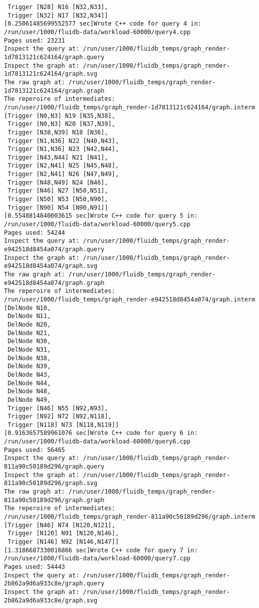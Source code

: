 \begin{code}
\begin{verbatim}
 Trigger [N28] N16 [N32,N33],
 Trigger [N32] N17 [N32,N34]]
[0.25061485699552577 sec]Wrote C++ code for query 4 in: /run/user/1000/fluidb-data/workload-60000/query4.cpp
Pages used: 23231
Inspect the query at: /run/user/1000/fluidb_temps/graph_render-1d7813121c624164/graph.query
Inspect the graph at: /run/user/1000/fluidb_temps/graph_render-1d7813121c624164/graph.svg
The raw graph at: /run/user/1000/fluidb_temps/graph_render-1d7813121c624164/graph.graph
The reperoire of intermediates: /run/user/1000/fluidb_temps/graph_render-1d7813121c624164/graph.interm
[Trigger [N0,N3] N19 [N35,N38],
 Trigger [N0,N3] N20 [N37,N39],
 Trigger [N38,N39] N18 [N36],
 Trigger [N1,N36] N22 [N40,N43],
 Trigger [N1,N36] N23 [N42,N44],
 Trigger [N43,N44] N21 [N41],
 Trigger [N2,N41] N25 [N45,N48],
 Trigger [N2,N41] N26 [N47,N49],
 Trigger [N48,N49] N24 [N46],
 Trigger [N46] N27 [N50,N51],
 Trigger [N50] N53 [N50,N90],
 Trigger [N90] N54 [N90,N91]]
[0.5548814840003615 sec]Wrote C++ code for query 5 in: /run/user/1000/fluidb-data/workload-60000/query5.cpp
Pages used: 54244
Inspect the query at: /run/user/1000/fluidb_temps/graph_render-e942518d8454a074/graph.query
Inspect the graph at: /run/user/1000/fluidb_temps/graph_render-e942518d8454a074/graph.svg
The raw graph at: /run/user/1000/fluidb_temps/graph_render-e942518d8454a074/graph.graph
The reperoire of intermediates: /run/user/1000/fluidb_temps/graph_render-e942518d8454a074/graph.interm
[DelNode N10,
 DelNode N11,
 DelNode N20,
 DelNode N21,
 DelNode N30,
 DelNode N31,
 DelNode N38,
 DelNode N39,
 DelNode N43,
 DelNode N44,
 DelNode N48,
 DelNode N49,
 Trigger [N46] N55 [N92,N93],
 Trigger [N92] N72 [N92,N118],
 Trigger [N118] N73 [N118,N119]]
[0.9163657589961076 sec]Wrote C++ code for query 6 in: /run/user/1000/fluidb-data/workload-60000/query6.cpp
Pages used: 56465
Inspect the query at: /run/user/1000/fluidb_temps/graph_render-811a90c50189d296/graph.query
Inspect the graph at: /run/user/1000/fluidb_temps/graph_render-811a90c50189d296/graph.svg
The raw graph at: /run/user/1000/fluidb_temps/graph_render-811a90c50189d296/graph.graph
The reperoire of intermediates: /run/user/1000/fluidb_temps/graph_render-811a90c50189d296/graph.interm
[Trigger [N46] N74 [N120,N121],
 Trigger [N120] N91 [N120,N146],
 Trigger [N146] N92 [N146,N147]]
[1.3186687330016866 sec]Wrote C++ code for query 7 in: /run/user/1000/fluidb-data/workload-60000/query7.cpp
Pages used: 54443
Inspect the query at: /run/user/1000/fluidb_temps/graph_render-2b862a9d6a933c8e/graph.query
Inspect the graph at: /run/user/1000/fluidb_temps/graph_render-2b862a9d6a933c8e/graph.svg

\end{verbatim}
\end{code}
